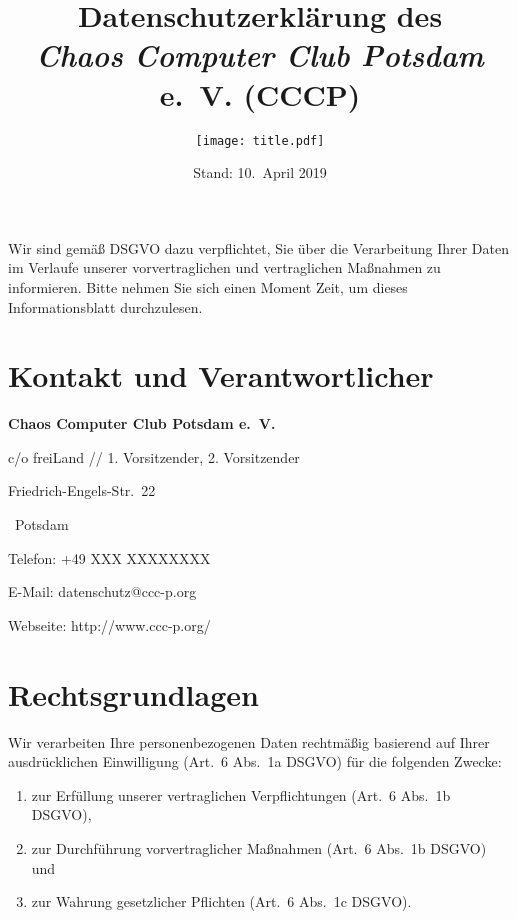 \documentclass[a4paper, 10pt, headings=normal]{scrartcl}
\title{Datenschutzerklärung des \\ \emph{Chaos Computer Club Potsdam} e.~V. (CCCP)}
\author{\texttt{[image: title.pdf]}}
\date{Stand: 10.~April 2019}
\begin{document}
\maketitle
\pagestyle{myheadings}

\begin{multicols*}{2}

\noindent Wir sind gemäß DSGVO dazu verpflichtet, Sie über die Verarbeitung Ihrer Daten im Verlaufe unserer vorvertraglichen und vertraglichen Maßnahmen zu informieren.
Bitte nehmen Sie sich einen Moment Zeit, um dieses Informationsblatt durchzulesen.

\section{Kontakt und Verantwortlicher}%
%
\begin{address}\strut%
	\textbf{Chaos Computer Club Potsdam e.~V.}

	\noindent c/o freiLand // \textcolor{alert}{1. Vorsitzender, 2. Vorsitzender}

	\noindent Friedrich-Engels-Str.~22

	~Potsdam

	\medskip

	\noindent Telefon: +49 \textcolor{alert}{XXX XXXXXXXX}

	\noindent E-Mail: datenschutz@ccc-p.org

	\noindent Webseite: http://www.ccc-p.org/\strut
\end{address}

\section{Rechtsgrundlagen}

Wir verarbeiten Ihre personenbezogenen Daten rechtmäßig basierend auf Ihrer ausdrücklichen Einwilligung (Art.~6 Abs.~1a DSGVO) für die folgenden Zwecke:

\begin{enumerate}[label={\arabic*.}]
	\item
		zur Erfüllung unserer vertraglichen Verpflichtungen (Art.~6 Abs.~1b DSGVO),
	\item
		zur Durchführung vorvertraglicher Maßnahmen (Art.~6 Abs.~1b DSGVO) und
	\item
		zur Wahrung gesetzlicher Pflichten (Art.~6 Abs.~1c DSGVO).
\end{enumerate}


\end{multicols*}
\end{document}
